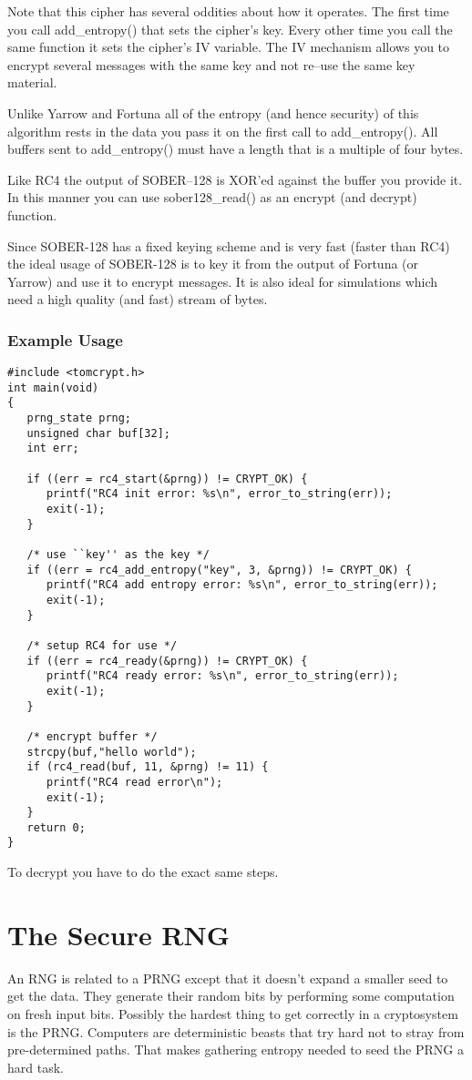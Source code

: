 \documentclass[a4paper]{book}
\begin{document}
Note that this cipher has several oddities about how it operates.  The first time you call 
add\_entropy() that sets the cipher's key.  Every other time you call the same function it sets
the cipher's IV variable.  The IV mechanism allows you to encrypt several messages with the same
key and not re--use the same key material.

Unlike Yarrow and Fortuna all of the entropy (and hence security) of this algorithm rests in the data
you pass it on the first call to add\_entropy().  All buffers sent to add\_entropy() must have a length
that is a multiple of four bytes.

Like RC4 the output of SOBER--128 is XOR'ed against the buffer you provide it.  In this manner you can use
sober128\_read() as an encrypt (and decrypt) function.

Since SOBER-128 has a fixed keying scheme and is very fast (faster than RC4) the ideal usage of SOBER-128 is to 
key it from the output of Fortuna (or Yarrow) and use it to encrypt messages.  It is also ideal for
simulations which need a high quality (and fast) stream of bytes.  

\subsubsection{Example Usage}
\begin{small}
\begin{verbatim}
#include <tomcrypt.h>
int main(void)
{
   prng_state prng;
   unsigned char buf[32];
   int err;

   if ((err = rc4_start(&prng)) != CRYPT_OK) {
      printf("RC4 init error: %s\n", error_to_string(err));
      exit(-1);
   }

   /* use ``key'' as the key */
   if ((err = rc4_add_entropy("key", 3, &prng)) != CRYPT_OK) {
      printf("RC4 add entropy error: %s\n", error_to_string(err));
      exit(-1);
   }

   /* setup RC4 for use */
   if ((err = rc4_ready(&prng)) != CRYPT_OK) {
      printf("RC4 ready error: %s\n", error_to_string(err));
      exit(-1);
   }

   /* encrypt buffer */
   strcpy(buf,"hello world");
   if (rc4_read(buf, 11, &prng) != 11) {
      printf("RC4 read error\n");
      exit(-1);
   }
   return 0;
}   
\end{verbatim}
\end{small}
To decrypt you have to do the exact same steps.  

\section{The Secure RNG}
An RNG is related to a PRNG except that it doesn't expand a smaller seed to get the data.  They generate their random bits
by performing some computation on fresh input bits.  Possibly the hardest thing to get correctly in a cryptosystem is the 
PRNG.  Computers are deterministic beasts that try hard not to stray from pre-determined paths.  That makes gathering 
entropy needed to seed the PRNG a hard task.  
\end{document}
